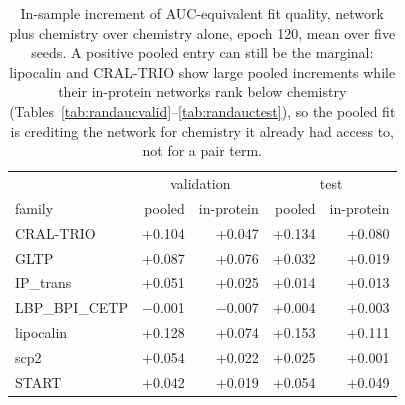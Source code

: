 \begin{table}[htbp]
\centering
\begin{tabular}{lrr|rr}
\hline
& \multicolumn{2}{c}{validation} & \multicolumn{2}{c}{test} \\
family & pooled & in-protein & pooled & in-protein \\
\hline
CRAL-TRIO & +0.104 & +0.047 & +0.134 & +0.080 \\
GLTP & +0.087 & +0.076 & +0.032 & +0.019 \\
IP\_trans & +0.051 & +0.025 & +0.014 & +0.013 \\
LBP\_BPI\_CETP & $-$0.001 & $-$0.007 & +0.004 & +0.003 \\
lipocalin & +0.128 & +0.074 & +0.153 & +0.111 \\
scp2 & +0.054 & +0.022 & +0.025 & +0.001 \\
START & +0.042 & +0.019 & +0.054 & +0.049 \\
\hline
\end{tabular}
\caption{In-sample increment of AUC-equivalent fit quality, network plus chemistry over
chemistry alone, epoch 120, mean over five seeds. A positive pooled entry can still be
the marginal: lipocalin and CRAL-TRIO show large pooled increments while their
in-protein networks rank below chemistry (Tables~\ref{tab:randaucvalid}--\ref{tab:randauctest}),
so the pooled fit is crediting the network for chemistry it already had access to, not
for a pair term.}
\label{tab:randincrement}
\end{table}

